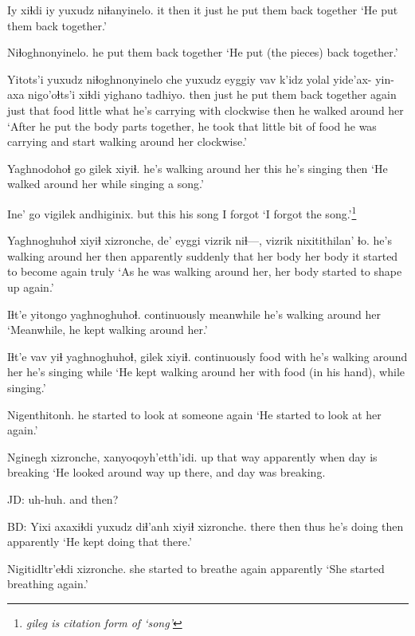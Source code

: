 \documentclass[12pt]{article}
\begin{document}
\gll Iy xiɬdi iy yuxudz niɬanyinelo.
it then  it just   {he put them back together}
\glt `He put them back together.'
\glend

\gll Niɬoghnonyinelo.
{{he put them back together}}
\glt `He put (the pieces) back together.'
\glend

\gll Yitots'i yuxudz niɬoghnonyinelo        che yuxudz   eyggiy vav  k'idz  yolal {yide'ax- yin-}  axa  nigo'oɬts'i xiɬdi {yighano tadhiyo.}
then     just   {he put them back together} again just that   food little {what he's carrying} {}  with clockwise     then  {he walked around her}
\glt `After he put the body parts together, he took that little bit of food he was carrying and start walking around her clockwise.'
\glend

\gll Yaghnodohoɬ             go   gilek xiyiɬ.
{he's walking around her} this {he's singing} then
\glt `He walked around her while singing a song.'
\glend

\gll Ine' go vigilek andhiginix.
but  this {his song} {I forgot}
\glt `I forgot the song.'\footnote{\em gileg \em is citation form of `song'}
\glend

\gll Yaghnoghuhoɬ            xiyiɬ xizronche,  de' eyggi vizrik niɬ---, vizrik  nixitithilan'    ɬo.
{he's walking around her} then  apparently suddenly that  {her body} {} {her body} {it started to become again} truly
\glt `As he was walking around her, her body started to shape up again.'
\glend

\gll Iɬt'e        yitongo   yaghnoghuhoɬ.
continuously meanwhile {he's walking around her}
\glt `Meanwhile, he kept walking around her.'
\glend

\gll Iɬt'e       vav  yiɬ  yaghnoghuhoɬ,           gilek   xiyiɬ.
continuously food with {he's walking around her} {he's singing} while
\glt `He kept walking around her with food (in his hand), while singing.'
\glend

\gll Nigenthitonh.
{{he started to look at someone again}}
\glt `He started to look at her again.'
\glend

\gll Nginegh     xizronche, xanyoqoyh'etth'idi.
{up that way} apparently {when day is breaking}
\glt `He looked around way up there, and day was breaking.
\glend

JD:  uh-huh. and then?

BD:  
\gll Yixi  axaxiɬdi yuxudz diɬ'anh  xiyiɬ xizronche.
there then     thus   {he's doing} then  apparently 
\glt `He kept doing that there.'
\glend

\gll Nigitidltr'eɬdi             xizronche.
{she started to breathe again} apparently
\glt `She started breathing again.'
\glend
\end{document}
